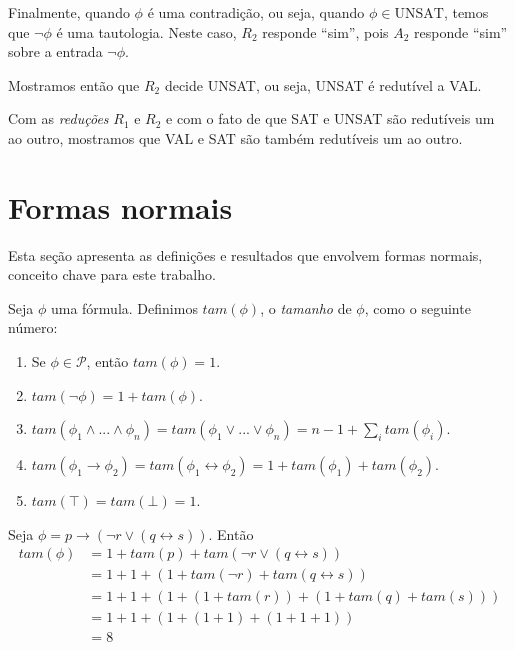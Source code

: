 Finalmente, quando $\phi$ é uma contradição, ou seja, quando $\phi \in \text{UNSAT}$, temos que $\neg \phi$ é uma tautologia. Neste caso, $R_2$ responde ``sim'', pois $A_2$ responde ``sim'' sobre a entrada $\neg \phi$.

Mostramos então que $R_2$ decide UNSAT, ou seja, UNSAT é redutível a VAL.

Com as \emph{reduções} $R_1$ e $R_2$ e com o fato de que SAT e UNSAT são redutíveis um ao outro, mostramos que VAL e SAT são também redutíveis um ao outro.

\section{Formas normais}

\indent

Esta seção apresenta as definições e resultados que envolvem formas normais, conceito chave para este trabalho.

\begin{definition}
	Seja $\phi$ uma fórmula. Definimos $tam(\phi)$, o \emph{tamanho} de $\phi$, como o seguinte número:
	\begin{enumerate}
		\item Se $\phi \in \mathcal{P}$, então $tam(\phi) = 1$.
		\item $tam(\neg \phi) = 1 + tam(\phi)$.
		\item $tam(\phi_1 \wedge ... \wedge \phi_n) = tam(\phi_1 \vee ... \vee \phi_n) = n - 1 + \sum_i tam(\phi_i)$.
		\item $tam(\phi_1 \rightarrow \phi_2) = tam(\phi_1 \leftrightarrow \phi_2) = 1 + tam(\phi_1) + tam(\phi_2)$.
		\item $tam(\top) = tam(\bot) = 1$.
	\end{enumerate}
\end{definition}

\begin{example}
	Seja $\phi = p \rightarrow (\neg r \vee (q \leftrightarrow s))$. Então
	\begin{equation*}
	\begin{split}
	tam(\phi) & = 1 + tam(p) + tam(\neg r \vee (q \leftrightarrow s))\\
	& = 1 + 1 + (1 + tam(\neg r) + tam(q \leftrightarrow s))\\
	& = 1 + 1 + (1 + (1 + tam(r)) + (1 + tam(q) + tam(s)))\\
	& = 1 + 1 + (1 + (1 + 1) + (1 + 1 + 1))\\
	& = 8\\
	\end{split}
	\end{equation*}
\end{example}

